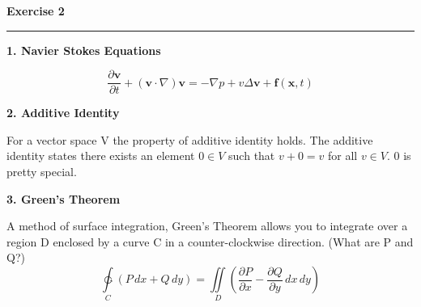 \documentclass{article}
\begin{document}
\newpage
\noindent \textbf{Exercise 2}

\noindent \rule{\textwidth}{.1mm}

\begin{center}
\textbf{1. Navier Stokes Equations}
\end{center}

\begin{equation*}
\frac{\partial \mathbf{v}}{\partial t} + \left( \mathbf{v} \cdot \nabla \right) \mathbf{v} =  - \nabla p + v \Delta \mathbf{v} + \mathbf{f}\left( \mathbf{x}, t\right)
\end{equation*}

\begin{center}
\textbf{2. Additive Identity}
\end{center}

For a vector space V the property of additive identity holds. The additive identity states there exists an element \(0 \in V\) such that \(v + 0 = v\) for all \(v \in V\). \(0\) is pretty special.

\begin{center}
\textbf{3. Green's Theorem}
\end{center}

A method of surface integration, Green's Theorem allows you to integrate over a region D enclosed by a curve C in a counter-clockwise direction. (What are P and Q?)
\begin{equation*}
\ointctrclockwise\limits_C \left( P \, dx + Q \, dy \right) = \iint\limits_D \left( \frac{\partial P}{\partial x} - \frac{\partial Q}{\partial y} \, dx \, dy \right)
\end{equation*}
\end{document}
